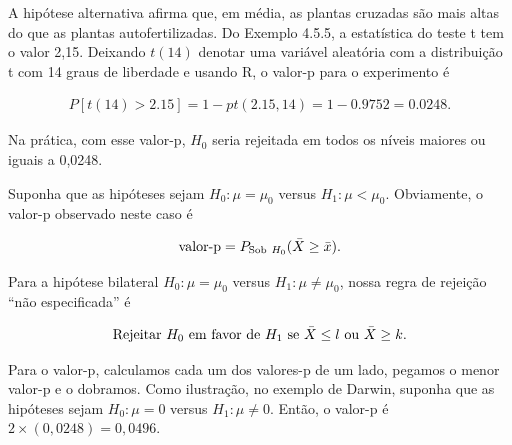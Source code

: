 \documentclass[12pt]{beamer}
\begin{document}
\begin{frame}{}
\begin{block}{}
\justifying
A hipótese alternativa afirma que, em média, as plantas cruzadas são mais altas do que as plantas autofertilizadas. Do Exemplo 4.5.5, a estatística do teste t tem o valor 2,15. Deixando $t(14)$ denotar uma variável aleatória com a distribuição t com 14 graus de liberdade e usando R, o valor-p para o experimento é

\begin{align*}
P[t(14) > 2.15] = 1 - pt(2.15, 14) = 1 - 0.9752 = 0.0248. 
\end{align*}

Na prática, com esse valor-p, $H_0$ seria rejeitada em todos os níveis maiores ou iguais a 0,0248.

Suponha que as hipóteses sejam $H_0 : \mu = \mu_0$ versus $H_1 : \mu < \mu_0$. Obviamente, o valor-p observado neste caso é

\begin{align*}
\text{valor-p} = P_{\text{Sob}~H_0}( \Bar{X} \geq \Bar{x}).
\end{align*}
\end{block}
\end{frame}

\begin{frame}{}
\begin{block}{}
\justifying
Para a hipótese bilateral $H_0 : \mu = \mu_0$ versus $H_1 : \mu \neq \mu_0$, nossa regra de rejeição ``não especificada'' é

\begin{align}
\text{Rejeitar } H_0 \text{ em favor de } H_1 \text{ se } \Bar{X} \leq l \text{ ou } \Bar{X} \geq k.
\end{align}

Para o valor-p, calculamos cada um dos valores-p de um lado, pegamos o menor valor-p e o dobramos. Como ilustração, no exemplo de Darwin, suponha que as hipóteses sejam $H_0 : \mu = 0$ versus $H_1 : \mu \neq 0$. Então, o valor-p é $2 \times (0,0248) = 0,0496$. 
\nocite{hogg}
\end{block}
\end{frame}

%
%
\end{document}
